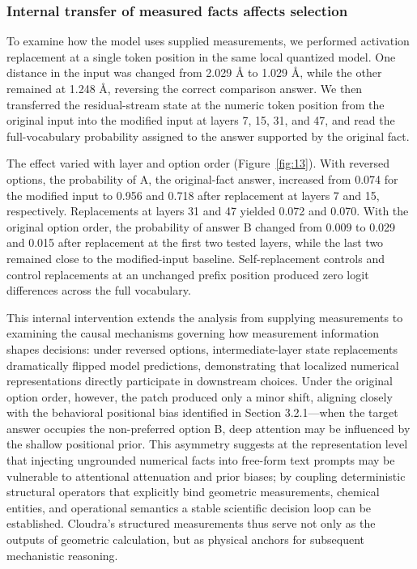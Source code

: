 \subsubsection{Internal transfer of measured facts affects selection}

To examine how the model uses supplied measurements, we performed activation replacement at a single token position in the same local quantized model.\citep{ref16} One distance in the input was changed from 2.029 Å to 1.029 Å, while the other remained at 1.248 Å, reversing the correct comparison answer. We then transferred the residual-stream state at the numeric token position from the original input into the modified input at layers 7, 15, 31, and 47, and read the full-vocabulary probability assigned to the answer supported by the original fact.

The effect varied with layer and option order (Figure~\ref{fig:13}). With reversed options, the probability of A, the original-fact answer, increased from 0.074 for the modified input to 0.956 and 0.718 after replacement at layers 7 and 15, respectively. Replacements at layers 31 and 47 yielded 0.072 and 0.070. With the original option order, the probability of answer B changed from 0.009 to 0.029 and 0.015 after replacement at the first two tested layers, while the last two remained close to the modified-input baseline. 
\newpage
\noindent
Self-replacement controls and control replacements at an unchanged prefix position produced zero logit differences across the full vocabulary.

This internal intervention extends the analysis from supplying measurements to examining the causal mechanisms governing how measurement information shapes decisions: under reversed options, intermediate-layer state replacements dramatically flipped model predictions, demonstrating that localized numerical representations directly participate in downstream choices. Under the original option order, however, the patch produced only a minor shift, aligning closely with the behavioral positional bias identified in Section 3.2.1—when the target answer occupies the non-preferred option B, deep attention may be influenced by the shallow positional prior. This asymmetry suggests at the representation level that injecting ungrounded numerical facts into free-form text prompts may be vulnerable to attentional attenuation and prior biases; by coupling deterministic structural operators that explicitly bind geometric measurements, chemical entities, and operational semantics a stable scientific decision loop can be established. Cloudra's structured measurements thus serve not only as the outputs of geometric calculation, but as physical anchors for subsequent mechanistic reasoning.

